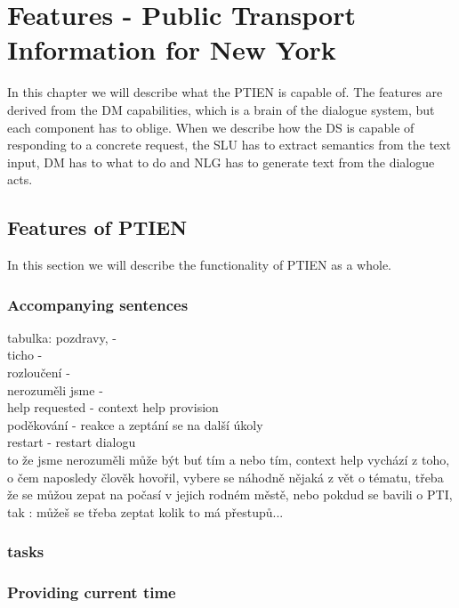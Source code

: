 \chapter{Features - Public Transport Information for New York}

In this chapter we will describe what the PTIEN is capable of. The features are derived from the DM capabilities, which is a brain of the dialogue system, but each component has to oblige. When we describe how the DS is capable of responding to a concrete request, the SLU has to extract semantics from the text input, DM has to what to do and NLG has to generate text from the dialogue acts.


\section{Features of PTIEN}

In this section we will describe the functionality of PTIEN as a whole.

\subsection{Accompanying sentences}

tabulka:
pozdravy, -  \\
ticho -  \\
rozloučení -  \\
nerozuměli jsme -  \\
help requested - context help provision \\
poděkování - reakce a zeptání se na další úkoly \\
restart - restart dialogu \\

to že jsme nerozuměli může být buť tím a nebo tím,
context help vychází z toho, o čem naposledy člověk hovořil, vybere se náhodně nějaká z vět o tématu, třeba že se můžou zepat na počasí v jejich rodném městě, nebo pokdud se bavili o PTI, tak : můžeš se třeba zeptat kolik to má přestupů...




\subsection{tasks}

\subsection{Providing current time} \label{subsec:time}

